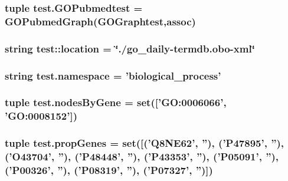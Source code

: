 \label{namespacetest_a49256f3800de70e9aabf11ea0c3bb8e1}
\hypertarget{namespacetest_a2565076d50762c7d466830ecbabb1671}{
\subsubsection[{GOPubmedtest}]{\setlength{\rightskip}{0pt plus 5cm}tuple {\bf test.GOPubmedtest} = {\bf GOPubmedGraph}({\bf GOGraphtest},{\bf assoc})}}
\label{namespacetest_a2565076d50762c7d466830ecbabb1671}
\hypertarget{namespacetest_a4ee7d63d9426ae32ba96ad2f0e171511}{
\subsubsection[{location}]{\setlength{\rightskip}{0pt plus 5cm}string {\bf test::location} = \char`\"{}./go\_\-daily-\/termdb.obo-\/xml\char`\"{}}}
\label{namespacetest_a4ee7d63d9426ae32ba96ad2f0e171511}
\hypertarget{namespacetest_a1429061289985226ca44c2e4e888d77e}{
\subsubsection[{namespace}]{\setlength{\rightskip}{0pt plus 5cm}string {\bf test.namespace} = 'biological\_\-process'}}
\label{namespacetest_a1429061289985226ca44c2e4e888d77e}
\hypertarget{namespacetest_aa8cc3a0b86b4a37acf878753845ac845}{
\subsubsection[{nodesByGene}]{\setlength{\rightskip}{0pt plus 5cm}tuple {\bf test.nodesByGene} = set(\mbox{[}'GO:0006066', 'GO:0008152'\mbox{]})}}
\label{namespacetest_aa8cc3a0b86b4a37acf878753845ac845}
\hypertarget{namespacetest_a6b190968f9c7fc0593c63df10224e21a}{
\subsubsection[{propGenes}]{\setlength{\rightskip}{0pt plus 5cm}tuple {\bf test.propGenes} = set(\mbox{[}('Q8NE62', ''), ('P47895', ''), ('O43704', ''), ('P48448', ''), ('P43353', ''), ('P05091', ''), ('P00326', ''), ('P08319', ''), ('P07327', '')\mbox{]})}}
